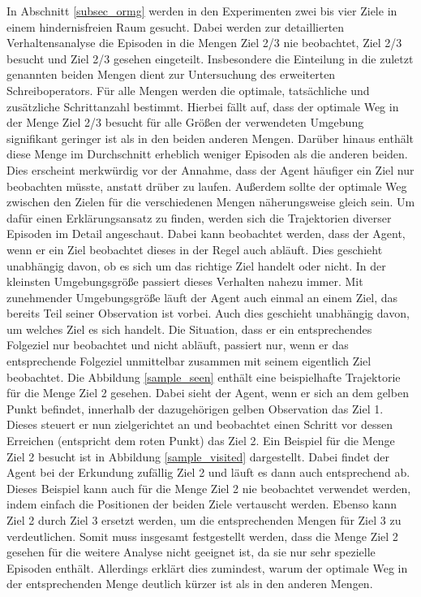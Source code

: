 In Abschnitt \ref{subsec_ormg} werden in den Experimenten zwei bis vier Ziele in einem hindernisfreien Raum gesucht. Dabei werden zur detaillierten Verhaltensanalyse die Episoden in die Mengen \glqq Ziel 2/3 nie beobachtet\grqq{}, \glqq Ziel 2/3 besucht\grqq{} und \glqq Ziel 2/3 gesehen\grqq{} eingeteilt. Insbesondere die Einteilung in die zuletzt genannten beiden Mengen dient zur Untersuchung des erweiterten Schreiboperators. Für alle Mengen werden die optimale, tatsächliche und zusätzliche Schrittanzahl bestimmt. Hierbei fällt auf, dass der optimale Weg in der Menge \glqq Ziel 2/3 besucht\grqq{} für alle Größen der verwendeten Umgebung signifikant geringer ist als in den beiden anderen Mengen. Darüber hinaus enthält diese Menge im Durchschnitt erheblich weniger Episoden als die anderen beiden. Dies erscheint merkwürdig vor der Annahme, dass der Agent häufiger ein Ziel nur beobachten müsste, anstatt drüber zu laufen. Außerdem sollte der optimale Weg zwischen den Zielen für die verschiedenen Mengen näherungsweise gleich sein. Um dafür einen Erklärungsansatz zu finden, werden sich die Trajektorien diverser Episoden im Detail angeschaut. Dabei kann beobachtet werden, dass der Agent, wenn er ein Ziel beobachtet dieses in der Regel auch abläuft. Dies geschieht unabhängig davon, ob es sich um das richtige Ziel handelt oder nicht. In der kleinsten Umgebungsgröße passiert dieses Verhalten nahezu immer. Mit zunehmender Umgebungsgröße läuft der Agent auch einmal an einem Ziel, das bereits Teil seiner Observation ist vorbei. Auch dies geschieht unabhängig davon, um welches Ziel es sich handelt. Die Situation, dass er ein entsprechendes Folgeziel nur beobachtet und nicht abläuft, passiert nur, wenn er das entsprechende Folgeziel unmittelbar zusammen mit seinem eigentlich Ziel beobachtet. Die Abbildung \ref{sample_seen} enthält eine beispielhafte Trajektorie für die Menge \glqq Ziel 2 gesehen\grqq{}. Dabei sieht der Agent, wenn er sich an dem gelben Punkt befindet, innerhalb der dazugehörigen gelben Observation das Ziel 1. Dieses steuert er nun zielgerichtet an und beobachtet einen Schritt vor dessen Erreichen (entspricht dem roten Punkt) das Ziel 2. Ein Beispiel für die Menge \glqq Ziel 2 besucht\grqq{} ist in Abbildung \ref{sample_visited} dargestellt. Dabei findet der Agent bei der Erkundung zufällig Ziel 2 und läuft es dann auch entsprechend ab. Dieses Beispiel kann auch für die Menge \glqq Ziel 2 nie beobachtet\grqq{} verwendet werden, indem einfach die Positionen der beiden Ziele vertauscht werden. Ebenso kann Ziel 2 durch Ziel 3 ersetzt werden, um die entsprechenden Mengen für Ziel 3 zu verdeutlichen. Somit muss insgesamt festgestellt werden, dass die Menge \glqq Ziel 2 gesehen\grqq{} für die weitere Analyse nicht geeignet ist, da sie nur sehr spezielle Episoden enthält. Allerdings erklärt dies zumindest, warum der optimale Weg in der entsprechenden Menge deutlich kürzer ist als in den anderen Mengen.

